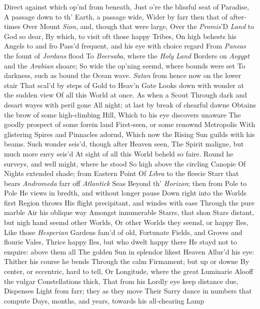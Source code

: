 \documentclass[11pt]{book}
\newcounter {first}
\newcounter {last}
\begin{document}
Direct against which op'nd from beneath, 
Just o're the blissful seat of Paradise, 
A passage down to th' Earth, a passage wide, 
Wider by farr then that of after-times 
Over Mount \textit{Sion}, and, though that were large, 
Over the \textit{Promis}'D \textit{Land} to God so dear, 
By which, to visit oft those happy Tribes, 
On high behests his Angels to and fro 
Pass'd frequent, and his eye with choice regard 
From \textit{Paneas} the fount of \textit{Jordans} flood 
To \textit{Beersaba}, where the \textit{Holy} \textit{Land} 
Borders on \textit{Aegypt} and the \textit{Arabian} shoare; 
So wide the op'ning seemd, where bounds were set 
To darkness, such as bound the Ocean wave. 
\textit{Satan} from hence now on the lower stair 
That scal'd by steps of Gold to Heav'n Gate 
Looks down with wonder at the sudden view 
Of all this World at once.  As when a Scout 
Through dark and desart wayes with peril gone 
All night; at last by break of chearful dawne 
Obtains the brow of some high-climbing Hill, 
Which to his eye discovers unaware 
The goodly prospect of some forein land 
First-seen, or some renownd Metropolis 
With glistering Spires and Pinnacles adornd, 
Which now the Rising Sun guilds with his beams. 
Such wonder seis'd, though after Heaven seen, 
The Spirit maligne, but much more envy seis'd 
At sight of all this World beheld so faire. 
Round he surveys, and well might, where he stood 
So high above the circling Canopie 
Of Nights extended shade; from Eastern Point 
Of \textit{Libra} to the fleecie Starr that bears 
\textit{Andromeda} farr off \textit{Atlantick} Seas 
Beyond th' \textit{Horizon}; then from Pole to Pole 
He views in bredth, and without longer pause 
Down right into the Worlds first Region throws 
His flight precipitant, and windes with ease 
Through the pure marble Air his oblique way 
Amongst innumerable Starrs, that shon 
Stars distant, but nigh hand seemd other Worlds, 
Or other Worlds they seemd, or happy Iles, 
Like those \textit{Hesperian} Gardens fam'd of old, 
Fortunate Fields, and Groves and flourie Vales, 
Thrice happy Iles, but who dwelt happy there 
He stayd not to enquire: above them all 
The golden Sun in splendor likest Heaven 
Allur'd his eye: Thither his course he bends 
Through the calm Firmament; but up or downe 
By center, or eccentric, hard to tell, 
Or Longitude, where the great Luminarie 
Alooff the vulgar Constellations thick, 
That from his Lordly eye keep distance due, 
Dispenses Light from farr; they as they move 
Their Sarry dance in numbers that compute 
Days, months, and years, towards his all-chearing Lamp 
\end{document}
